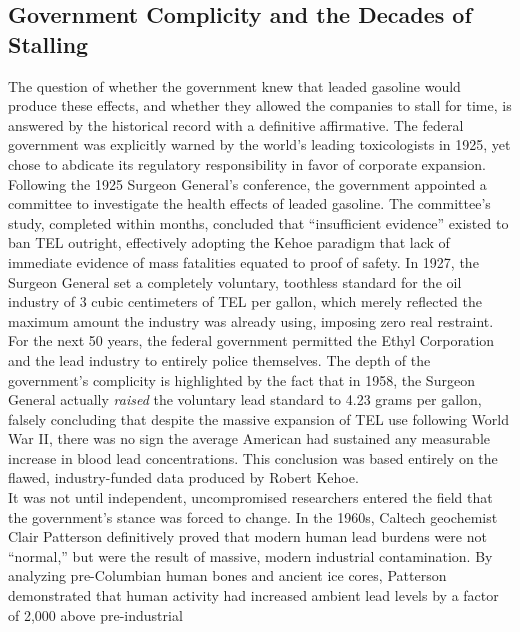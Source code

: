 \documentclass[
]{article}
\begin{document}
\subsection{\texorpdfstring{\textbf{Government Complicity and the
Decades of
Stalling}}{Government Complicity and the Decades of Stalling}}\label{government-complicity-and-the-decades-of-stalling}

The question of whether the government knew that leaded gasoline would
produce these effects, and whether they allowed the companies to stall
for time, is answered by the historical record with a definitive
affirmative. The federal government was explicitly warned by the world's
leading toxicologists in 1925, yet chose to abdicate its regulatory
responsibility in favor of corporate expansion.\\
Following the 1925 Surgeon General's conference, the government
appointed a committee to investigate the health effects of leaded
gasoline. The committee's study, completed within months, concluded that
``insufficient evidence'' existed to ban TEL outright, effectively
adopting the Kehoe paradigm that lack of immediate evidence of mass
fatalities equated to proof of safety. In 1927, the Surgeon General set
a completely voluntary, toothless standard for the oil industry of 3
cubic centimeters of TEL per gallon, which merely reflected the maximum
amount the industry was already using, imposing zero real restraint.\\
For the next 50 years, the federal government permitted the Ethyl
Corporation and the lead industry to entirely police themselves. The
depth of the government's complicity is highlighted by the fact that in
1958, the Surgeon General actually \emph{raised} the voluntary lead
standard to 4.23 grams per gallon, falsely concluding that despite the
massive expansion of TEL use following World War II, there was no sign
the average American had sustained any measurable increase in blood lead
concentrations. This conclusion was based entirely on the flawed,
industry-funded data produced by Robert Kehoe.\\
It was not until independent, uncompromised researchers entered the
field that the government's stance was forced to change. In the 1960s,
Caltech geochemist Clair Patterson definitively proved that modern human
lead burdens were not ``normal,'' but were the result of massive, modern
industrial contamination. By analyzing pre-Columbian human bones and
ancient ice cores, Patterson demonstrated that human activity had
increased ambient lead levels by a factor of 2,000 above pre-industrial
\end{document}
